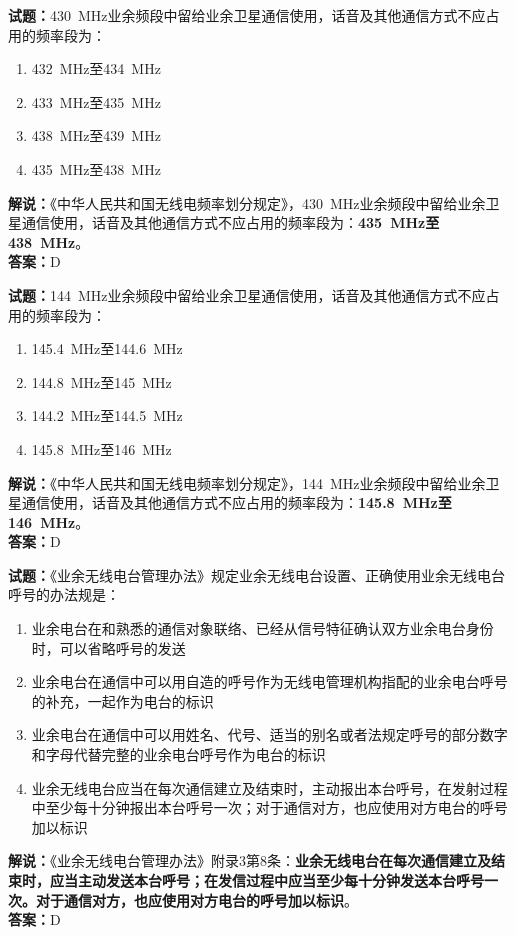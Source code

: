 \documentclass{ctexbook}
\begin{document}
\vspace{\baselineskip}

\noindent\textbf{试题：}\qty{430}{\MHz}业余频段中留给业余卫星通信使用，话音及其他通信方式不应占用的频率段为：
\begin{enumerate}[leftmargin=3em]
  \item \qty{432}{\MHz}至\qty{434}{\MHz}
  \item \qty{433}{\MHz}至\qty{435}{\MHz}
  \item \qty{438}{\MHz}至\qty{439}{\MHz}
  \item \qty{435}{\MHz}至\qty{438}{\MHz}
\end{enumerate}
\noindent\textbf{解说：}《中华人民共和国无线电频率划分规定》，\qty{430}{\MHz}业余频段中留给业余卫星通信使用，话音及其他通信方式不应占用的频率段为：\textbf{\qty{435}{\MHz}至\qty{438}{\MHz}}。\\\noindent\textbf{答案：}D

\vspace{\baselineskip}

\noindent\textbf{试题：}\qty{144}{\MHz}业余频段中留给业余卫星通信使用，话音及其他通信方式不应占用的频率段为：
\begin{enumerate}[leftmargin=3em]
  \item \qty{145.4}{\MHz}至\qty{144.6}{\MHz}
  \item \qty{144.8}{\MHz}至\qty{145}{\MHz}
  \item \qty{144.2}{\MHz}至\qty{144.5}{\MHz}
  \item \qty{145.8}{\MHz}至\qty{146}{\MHz}
\end{enumerate}
\noindent\textbf{解说：}《中华人民共和国无线电频率划分规定》，\qty{144}{\MHz}业余频段中留给业余卫星通信使用，话音及其他通信方式不应占用的频率段为：\textbf{\qty{145.8}{\MHz}至\qty{146}{\MHz}}。\\\noindent\textbf{答案：}D

\vspace{\baselineskip}

\noindent\textbf{试题：}《业余无线电台管理办法》规定业余无线电台设置、正确使用业余无线电台呼号的办法规是：
\begin{enumerate}[leftmargin=3em]
  \item 业余电台在和熟悉的通信对象联络、已经从信号特征确认双方业余电台身份时，可以省略呼号的发送
  \item 业余电台在通信中可以用自造的呼号作为无线电管理机构指配的业余电台呼号的补充，一起作为电台的标识
  \item 业余电台在通信中可以用姓名、代号、适当的别名或者法规定呼号的部分数字和字母代替完整的业余电台呼号作为电台的标识
  \item 业余无线电台应当在每次通信建立及结束时，主动报出本台呼号，在发射过程中至少每十分钟报出本台呼号一次；对于通信对方，也应使用对方电台的呼号加以标识
\end{enumerate}
\noindent\textbf{解说：}《业余无线电台管理办法》附录3第8条：\textbf{业余无线电台在每次通信建立及结束时，应当主动发送本台呼号；在发信过程中应当至少每十分钟发送本台呼号一次。对于通信对方，也应使用对方电台的呼号加以标识}。\\\noindent\textbf{答案：}D
\end{document}
